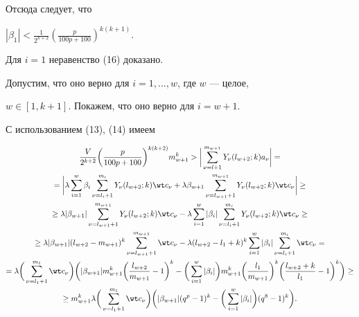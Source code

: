 Отсюда следует, что


$|\beta_1|<\frac{1}{2^{k+2}} (\frac{p}{100p+100})^{k(k+1)}$. 


Для $i=1$ неравенство (16) доказано.





Допустим, что оно верно для $i=1,\dotsc,w$, где $w$ --- целое,


$w \in [1, k+1]$. Покажем, что оно верно для $i=w+1$. 


С использованием (13), (14) имеем


\begin{multline*}


\frac{V}{2^{k+2}} \bigg(\frac{p}{100p+100}\bigg)^{k(k+2)} m_{w+1}^k>


\bigg| \sum_{\nu=l+1}^{m_{w+1}} Y_{\nu}(l_{w+2}; k) a_{\nu} \bigg|=\\


%


=\bigg|\lambda\sum_{i=1}^w\beta_i\sum_{\nu=l_i+1}^{m_{i}} Y_{\nu}(l_{w+2}; k) 


\wt c_{\nu}+\lambda \beta_{w+1} \sum_{\nu=l_{w+1}+1}^{m_{w+1}} 


Y_{\nu}(l_{w+2}; k) \wt c_{\nu} \bigg| \ge \\


%


\ge \lambda |\beta_{w+1}|\sum_{\nu=l_{w+1}+1}^{m_{w+1}} Y_{\nu}(l_{w+2};k)


\wt c_{\nu}-\lambda \sum_{i=1}^{w} | \beta_i | 


\sum_{\nu=l_i+1}^{m_{i}} Y_{\nu}(l_{w+2}; k) \wt c_{\nu} \ge \\


%


\ge \lambda | \beta_{w+1} | (l_{w+2}-m_{w+1})^k \sum_{\nu=l_{w+1}+1}^


{m_{w+1}} \wt c_{\nu}-\lambda (l_{w+2}-l_1+k)^k \sum_{i=1}^w | 


\beta_i | \sum_{\nu=l_{i}+1}^{m_{i}} \wt c_{\nu}= \\


%


= \lambda \bigg(\sum_{\nu=l_1+1}^{m_1} \wt c_{\nu}\bigg)\bigg(| \beta_{w+1} | 


m_{w+1}^k \bigg(\frac{l_{w+2}}{m_{w+1}} -1\bigg)^k-


\bigg(\sum_{i=1}^w | \beta_i |\bigg) m_{w+1}^k


\bigg(\frac{l_1}{m_{w+1}}\bigg)^k


\bigg(\frac{l_{w+2}+k}{l_1}-1\bigg)^k\bigg) \ge \\


%


\ge m_{w+1}^k \lambda \bigg(\sum_{\nu=l_1+1}^{m_1} \wt c_{\nu}\bigg)


\bigg(| \beta_{w+1} | 


(q^p-1)^k-\bigg(\sum_{i=1}^w | \beta_i |\bigg) (q^8-1)^k\bigg).


\end{multline*}


